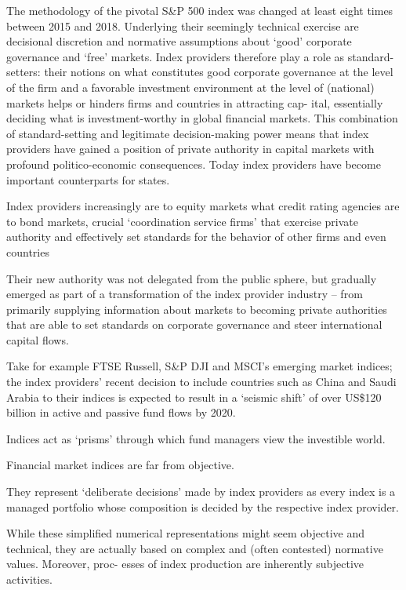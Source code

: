 \documentclass[
]{book}
\begin{document}
The methodology of the pivotal S\&P 500
index was changed at least eight times between 2015 and 2018. Underlying their
seemingly technical exercise are decisional discretion and normative assumptions
about `good' corporate governance and `free' markets. Index providers therefore
play a role as standard-setters: their notions on what constitutes good corporate
governance at the level of the firm and a favorable investment environment at the
level of (national) markets helps or hinders firms and countries in attracting cap-
ital, essentially deciding what is investment-worthy in global financial markets.
This combination of standard-setting and legitimate decision-making power means
that index providers have gained a position of private authority in capital markets
with profound politico-economic consequences.
Today index providers have become important counterparts for states.

Index providers increasingly are
to equity markets what credit rating agencies are to bond markets, crucial
`coordination service firms' that exercise private authority and effectively
set standards for the behavior of other firms and even countries

Their new authority was not delegated from
the public sphere, but gradually emerged as part of a transformation of the index
provider industry -- from primarily supplying information about markets to
becoming private authorities that are able to set standards on corporate governance and
steer international capital flows.

Take for example FTSE Russell, S\&P DJI and
MSCI's emerging market indices; the index providers' recent decision to include
countries such as China and Saudi Arabia to their indices is expected to result in a
`seismic shift' of over US\$120 billion in active and passive fund flows by 2020.

Indices act as `prisms' through which fund managers view the investible world.

Financial market indices are far from objective.

They represent `deliberate decisions'
made by index providers as every index is a managed portfolio whose composition
is decided by the respective index provider.

While these
simplified numerical representations might seem objective and technical, they are
actually based on complex and (often contested) normative values. Moreover, proc-
esses of index production are inherently subjective activities.
\end{document}
